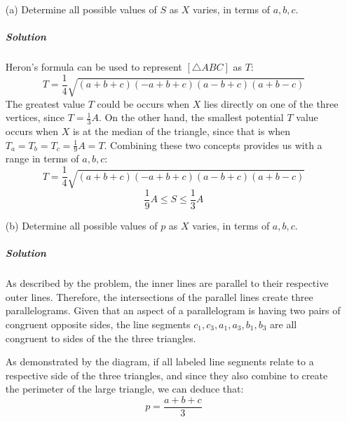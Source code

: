 \documentclass[a4paper]{amsart}
\begin{document}
\begin{flushleft}
		\begin{enumerate}
			\item[(a)] Determine all possible values of $S$ as $X$ varies, in terms of $a,b,c$.
			
			\subparagraph{\textit{Solution}} Heron's formula can be used to represent $[\triangle ABC]$ as $T$:
			\[ T=\frac{1}{4}\sqrt{(a+b+c)(-a+b+c)(a-b+c)(a+b-c)} \]
			The greatest value $T$ could be occurs when $X$ lies directly on one of the three vertices, since $T=\frac{1}{3}A$. On the other hand, the smallest potential $T$ value occurs when $X$ is at the median of the triangle, since that is when $T_a=T_b=T_c=\frac{1}{9}A=T$. Combining these two concepts provides us with a range in terms of $a,b,c$:
			\[ T=\frac{1}{4}\sqrt{(a+b+c)(-a+b+c)(a-b+c)(a+b-c)} \]
			\[ \frac{1}{9}A\leq S\leq\frac{1}{3}A \]
			
			\item[(b)] Determine all possible values of $p$ as $X$ varies, in terms of $a,b,c$.
			
			\subparagraph{\textit{Solution}} As described by the problem, the inner lines are parallel to their respective outer lines. Therefore, the intersections of the parallel lines create three parallelograms. Given that an aspect of a parallelogram is having two pairs of congruent opposite sides, the line segments $c_1,c_3,a_1,a_3,b_1,b_3$ are all congruent to sides of the the three triangles.
			\begin{center}
				
				As demonstrated by the diagram, if all labeled line segments relate to a respective side of the three triangles, and since they also combine to create the perimeter of the large triangle, we can deduce that:
				\[ p=\frac{a+b+c}{3} \]
			\end{center}
		\end{enumerate}
	\end{flushleft}
\end{document}
